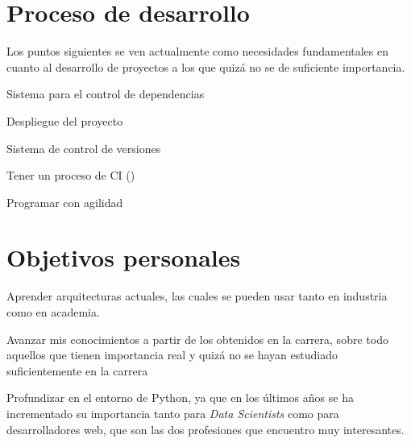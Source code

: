 \section{Proceso de desarrollo}
Los puntos siguientes se ven actualmente como necesidades fundamentales en cuanto al desarrollo de proyectos a los que quizá no se de suficiente importancia.
\begin{list}{-}{}
\item Sistema para el control de dependencias
\item Despliegue del proyecto
\item Sistema de control de versiones
\item Tener un proceso de CI () 
\item Programar con agilidad
\end{list}

\section{Objetivos personales}
\begin{list}{-}{}
\item Aprender arquitecturas actuales, las cuales se pueden usar tanto en industria como en academia.
\item Avanzar mis conocimientos a partir de los obtenidos en la carrera, sobre todo aquellos que tienen importancia real y quizá no se hayan estudiado suficientemente en la carrera
\item Profundizar en el entorno de Python, ya que en los últimos años se ha incrementado su importancia tanto para \textit{Data Scientists} como para desarrolladores web, que son las dos profesiones que encuentro muy interesantes.
\end{list}

